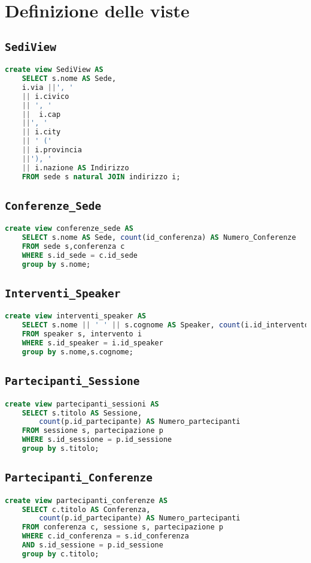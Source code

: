

\section{Definizione delle viste}
\subsection{\texttt{SediView}}
\begin{lstlisting}[language=SQL,style=mystyle]
	create view SediView AS 
	SELECT s.nome AS Sede, 
	i.via ||', ' 
	|| i.civico
	|| ', ' 
	||  i.cap 
	||', ' 
	|| i.city 
	|| ' (' 
	|| i.provincia 
	||'), '
	|| i.nazione AS Indirizzo
	FROM sede s natural JOIN indirizzo i;
\end{lstlisting}
\subsection{\texttt{Conferenze\_Sede}}
\begin{lstlisting}[language=SQL,style=mystyle]
	create view conferenze_sede AS
	SELECT s.nome AS Sede, count(id_conferenza) AS Numero_Conferenze
	FROM sede s,conferenza c
	WHERE s.id_sede = c.id_sede
	group by s.nome;
\end{lstlisting}
\subsection{\texttt{Interventi\_Speaker}}
\begin{lstlisting}[language=SQL,style=mystyle]
	create view interventi_speaker AS
	SELECT s.nome || ' ' || s.cognome AS Speaker, count(i.id_intervento)
	FROM speaker s, intervento i 
	WHERE s.id_speaker = i.id_speaker
	group by s.nome,s.cognome;
\end{lstlisting}
\subsection{\texttt{Partecipanti\_Sessione}}
\begin{lstlisting}[language=SQL,style=mystyle]
	create view partecipanti_sessioni AS
	SELECT s.titolo AS Sessione, 
		count(p.id_partecipante) AS Numero_partecipanti
	FROM sessione s, partecipazione p 
	WHERE s.id_sessione = p.id_sessione
	group by s.titolo;
\end{lstlisting}
\subsection{\texttt{Partecipanti\_Conferenze}}
\begin{lstlisting}[language=SQL,style=mystyle]
	create view partecipanti_conferenze AS
	SELECT c.titolo AS Conferenza, 
		count(p.id_partecipante) AS Numero_partecipanti
	FROM conferenza c, sessione s, partecipazione p
	WHERE c.id_conferenza = s.id_conferenza 
	AND s.id_sessione = p.id_sessione
	group by c.titolo;
\end{lstlisting}
